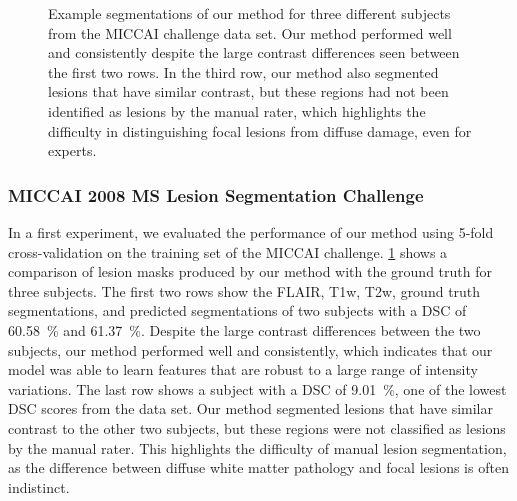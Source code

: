 \begin{figure}[tb]

\caption[Example segmentations of our method for three different subjects from
the MICCAI challenge data set]{Example segmentations of our method for three
different subjects from the MICCAI challenge data set. Our method performed well
and consistently despite the large contrast differences seen between the first
two rows. In the third row, our method also segmented lesions that have similar
contrast, but these regions had not been identified as lesions by the manual
rater, which highlights the difficulty in distinguishing focal lesions from
diffuse damage, even for experts.}

\label{fig:segmentation}
\end{figure}

\subsubsection{MICCAI 2008 MS Lesion Segmentation Challenge}

In a first experiment, we evaluated the performance of our method using 5-fold
cross-validation on the training set of the MICCAI challenge.
\ref{fig:segmentation} shows a comparison of lesion masks produced by our method
with the ground truth for three subjects. The first two rows show the FLAIR,
T1w, T2w, ground truth segmentations, and predicted segmentations of two
subjects with a DSC of \SI{60.58}{\percent} and \SI{61.37}{\percent}. Despite
the large contrast differences between the two subjects, our method performed
well and consistently, which indicates that our model was able to learn features
that are robust to a large range of intensity variations. The last row shows a
subject with a DSC of \SI{9.01}{\percent}, one of the lowest DSC scores from the
data set. Our method segmented lesions that have similar contrast to the other
two subjects, but these regions were not classified as lesions by the manual
rater. This highlights the difficulty of manual lesion segmentation, as the
difference between diffuse white matter pathology and focal lesions is often
indistinct.

